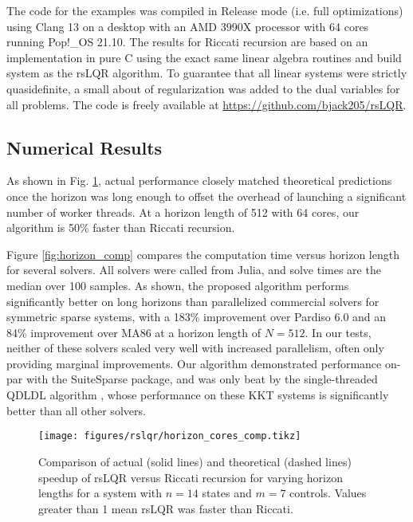 \documentclass[../root.tex]{subfiles}
\newcommand{\0}{{\transparent{0} \resizebox{\mycellheight}{\mycellheight}{0}}}
\begin{document}
The code for the examples was compiled in Release mode (i.e. full optimizations) using Clang
13 on a desktop with an AMD 3990X processor with 64 cores running Pop!\_OS 21.10. The
results for Riccati recursion are based on an implementation in pure C using the exact same
linear algebra routines and build system as the rsLQR algorithm. To guarantee that all
linear systems were strictly quasidefinite, a small about of regularization was added to the
dual variables for all problems. The code is freely available at 
\url{https://github.com/bjack205/rsLQR}.

\subsection{Numerical Results}
As shown in Fig. \ref{fig:actual_vs_theoretical}, actual performance closely matched theoretical predictions once the horizon was long
enough to offset the overhead of launching a significant number of worker threads.  At a
horizon length of 512 with 64 cores, our algorithm is 50\% faster than Riccati recursion.

Figure \ref{fig:horizon_comp} compares the computation time versus horizon length for
several solvers. All solvers were called from Julia, and solve times are the median over 100
samples. As shown, the proposed algorithm performs significantly better on long horizons
than parallelized commercial solvers for symmetric sparse systems, with a 183\% improvement
over Pardiso 6.0 \cite{schenk_PARDISO_2011} and an 84\% improvement over MA86
\cite{hogg_Indefinite_2010} at a horizon length of $N = 512$.  In our tests, neither of these
solvers scaled very well with increased parallelism, often only providing marginal
improvements. Our algorithm demonstrated performance on-par with the SuiteSparse
package, and was only beat by the single-threaded QDLDL algorithm \cite{stellato_OSQP_2020},
whose performance on these KKT systems is significantly better than all other solvers.

\begin{figure}
    \centering
    \texttt{[image: figures/rslqr/horizon\_cores\_comp.tikz]}
    \caption{Comparison of actual (solid lines) and theoretical (dashed lines) speedup of 
    rsLQR versus Riccati recursion for varying horizon lengths for a system with $n=14$ 
    states and $m=7$ controls. Values greater than 1 mean 
    rsLQR was faster than Riccati.}
    \label{fig:actual_vs_theoretical}
\end{figure}
\end{document}
